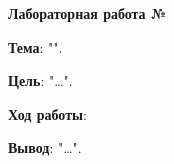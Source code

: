 \documentclass[12pt, a4paper, simple]{eskdtext}
\begin{document}
    \begin{ESKDtitlePage}
        
    \end{ESKDtitlePage}

    \begin{center}
        \textbf{Лабораторная работа №\titlePageLabNumber}
    \end{center}

    \textbf{Тема}: "\titlePageTopic".

    \textbf{Цель}: "\dots".

    \textbf{Ход работы}:

    

   \textbf{Вывод}: "\dots".
\end{document}
